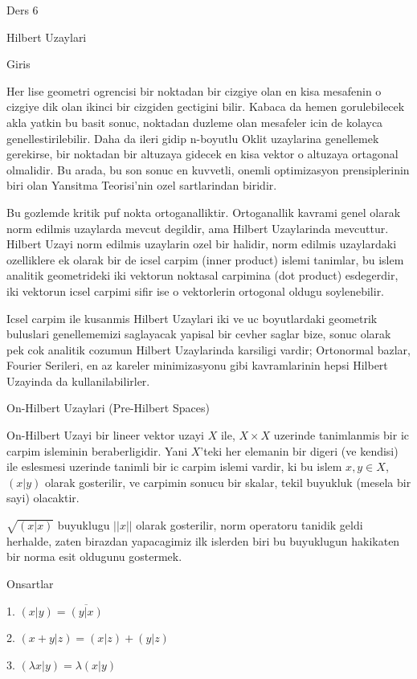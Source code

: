 \documentclass[12pt,fleqn]{article}\usepackage{../common}
\begin{document}
Ders 6

Hilbert Uzaylari 

Giris 

Her lise geometri ogrencisi bir noktadan bir cizgiye olan en kisa mesafenin
o cizgiye dik olan ikinci bir cizgiden gectigini bilir. Kabaca da hemen
gorulebilecek akla yatkin bu basit sonuc, noktadan duzleme olan mesafeler
icin de kolayca genellestirilebilir. Daha da ileri gidip n-boyutlu Oklit
uzaylarina genellemek gerekirse, bir noktadan bir altuzaya gidecek en kisa
vektor o altuzaya ortagonal olmalidir. Bu arada, bu son sonuc en kuvvetli,
onemli optimizasyon prensiplerinin biri olan Yansitma Teorisi'nin ozel
sartlarindan biridir.

Bu gozlemde kritik puf nokta ortoganalliktir. Ortoganallik kavrami genel
olarak norm edilmis uzaylarda mevcut degildir, ama Hilbert Uzaylarinda
mevcuttur. Hilbert Uzayi norm edilmis uzaylarin ozel bir halidir, norm
edilmis uzaylardaki ozelliklere ek olarak bir de icsel carpim (inner
product) islemi tanimlar, bu islem analitik geometrideki iki vektorun
noktasal carpimina (dot product) esdegerdir, iki vektorun icsel carpimi
sifir ise o vektorlerin ortogonal oldugu soylenebilir.

Icsel carpim ile kusanmis Hilbert Uzaylari iki ve uc boyutlardaki geometrik
buluslari genellememizi saglayacak yapisal bir cevher saglar bize, sonuc
olarak pek cok analitik cozumun Hilbert Uzaylarinda karsiligi vardir;
Ortonormal bazlar, Fourier Serileri, en az kareler minimizasyonu gibi
kavramlarinin hepsi Hilbert Uzayinda da kullanilabilirler.

On-Hilbert Uzaylari (Pre-Hilbert Spaces)

On-Hilbert Uzayi bir lineer vektor uzayi $X$ ile, $X \times X$ uzerinde
tanimlanmis bir ic carpim isleminin beraberligidir. Yani $X$'teki her
elemanin bir digeri (ve kendisi) ile eslesmesi uzerinde tanimli bir ic
carpim islemi vardir, ki bu islem $x,y \in X$, $(x|y)$ olarak gosterilir,
ve carpimin sonucu bir skalar, tekil buyukluk (mesela bir sayi) olacaktir. 

$\sqrt{ (x|x)}$ buyuklugu $||x||$ olarak gosterilir, norm operatoru tanidik
geldi herhalde, zaten birazdan yapacagimiz ilk islerden biri bu buyuklugun
hakikaten bir norma esit oldugunu gostermek. 

Onsartlar 

1. $(x|y) = \overline{(y|x)}$

2. $(x+y|z) = (x|z) + (y|z)$

3. $(\lambda x|y) = \lambda(x|y)$
\end{document}
